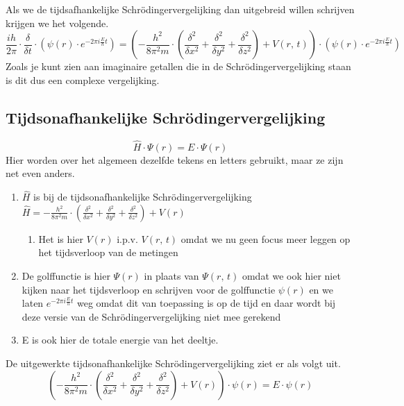\documentclass[11pt,fleqn]{book} %
\begin{document}
Als we de tijdsafhankelijke Schrödingervergelijking dan uitgebreid willen schrijven krijgen we het volgende.
\begin{displaymath}
\frac{ih}{2\pi}\cdot\frac{\delta}{\delta t}\cdot \left(\psi(r)\cdot e^{-2\pi i\frac{E}{h}t}\right) = \left(-\frac{h^2}{8\pi^2m}\cdot\left(\frac{\delta^2}{\delta x^2}+\frac{\delta^2}{\delta y^2}+\frac{\delta^2}{\delta z^2}\right)+V(r,\,t)\right)\cdot\left(\psi(r)\cdot e^{-2\pi i \frac{E}{h}t}\right)
\end{displaymath}
Zoals je kunt zien aan imaginaire getallen die in de Schrödingervergelijking staan is dit dus een complexe vergelijking.\cite{wiki:schr}\cite{wiki:ham}

\subsection{Tijdsonafhankelijke Schrödingervergelijking}
\begin{displaymath}
\hat{H}\cdot \Psi(r)=E\cdot \Psi(r)
\end{displaymath}
Hier worden over het algemeen dezelfde tekens en letters gebruikt, maar ze zijn net even anders.
\begin{enumerate}
\item $\hat{H}$ is bij de tijdsonafhankelijke Schrödingervergelijking $\hat{H}=-\frac{h^2}{8\pi^2m}\cdot \left(\frac{\delta^2}{\delta x^2}+\frac{\delta^2}{\delta y^2}+\frac{\delta^2}{\delta z^2}\right)+V(r)$
\begin{enumerate}
\item Het is hier $V(r)$ i.p.v. $V(r,\,t)$ omdat we nu geen focus meer leggen op het tijdsverloop van de metingen
\end{enumerate}
\item De golffunctie is hier $\Psi(r)$ in plaats van $\Psi(r,\,t)$ omdat we ook hier niet kijken naar het tijdsverloop en schrijven voor de golffunctie $\psi(r)$ en we laten $e^{-2\pi i\frac{E}{h}t}$ weg omdat dit van toepassing is op de tijd en daar wordt bij deze versie van de Schrödingervergelijking niet mee gerekend
\item E is ook hier de totale energie van het deeltje.
\end{enumerate}

De uitgewerkte tijdsonafhankelijke Schrödingervergelijking ziet er als volgt uit.
\begin{displaymath}
\left(-\frac{h^2}{8\pi^2m}\cdot \left(\frac{\delta^2}{\delta x^2}+\frac{\delta^2}{\delta y^2}+\frac{\delta^2}{\delta z^2}\right)+V(r)\right)\cdot \psi(r)=E\cdot \psi(r)
\end{displaymath}
\end{document}
